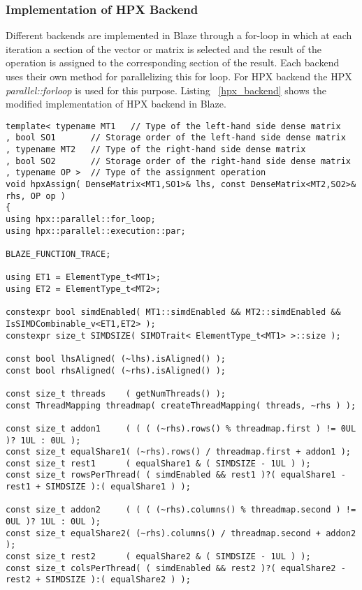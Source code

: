 \subsubsection{Implementation of HPX Backend}

Different backends are implemented in Blaze through a for-loop in which at each iteration a section of the vector or matrix is selected and the result of the operation is assigned to the corresponding section of the result. 
Each backend uses their own method for parallelizing this for loop. For HPX backend the HPX \textit{parallel::for\textunderscore loop} is used for this purpose. 
Listing ~\ref{hpx_backend} shows the modified implementation of HPX backend in Blaze.



\begin{lstlisting}[float,floatplacement=H,caption= {Previous implementation of Assign function for HPX backend in Blaze.}, label={old_hpx_backend}]
template< typename MT1   // Type of the left-hand side dense matrix
, bool SO1       // Storage order of the left-hand side dense matrix
, typename MT2   // Type of the right-hand side dense matrix
, bool SO2       // Storage order of the right-hand side dense matrix
, typename OP >  // Type of the assignment operation
void hpxAssign( DenseMatrix<MT1,SO1>& lhs, const DenseMatrix<MT2,SO2>& rhs, OP op )
{
using hpx::parallel::for_loop;
using hpx::parallel::execution::par;

BLAZE_FUNCTION_TRACE;

using ET1 = ElementType_t<MT1>;
using ET2 = ElementType_t<MT2>;

constexpr bool simdEnabled( MT1::simdEnabled && MT2::simdEnabled && IsSIMDCombinable_v<ET1,ET2> );
constexpr size_t SIMDSIZE( SIMDTrait< ElementType_t<MT1> >::size );

const bool lhsAligned( (~lhs).isAligned() );
const bool rhsAligned( (~rhs).isAligned() );

const size_t threads    ( getNumThreads() );
const ThreadMapping threadmap( createThreadMapping( threads, ~rhs ) );

const size_t addon1     ( ( ( (~rhs).rows() % threadmap.first ) != 0UL )? 1UL : 0UL );
const size_t equalShare1( (~rhs).rows() / threadmap.first + addon1 );
const size_t rest1      ( equalShare1 & ( SIMDSIZE - 1UL ) );
const size_t rowsPerThread( ( simdEnabled && rest1 )?( equalShare1 - rest1 + SIMDSIZE ):( equalShare1 ) );

const size_t addon2     ( ( ( (~rhs).columns() % threadmap.second ) != 0UL )? 1UL : 0UL );
const size_t equalShare2( (~rhs).columns() / threadmap.second + addon2 );
const size_t rest2      ( equalShare2 & ( SIMDSIZE - 1UL ) );
const size_t colsPerThread( ( simdEnabled && rest2 )?( equalShare2 - rest2 + SIMDSIZE ):( equalShare2 ) );


\end{lstlisting}
